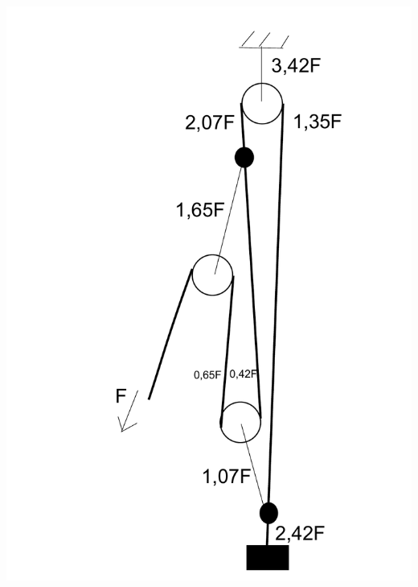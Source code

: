\documentclass[11pt]{article}
\begin{document}
{\begin{center}
\includegraphics[scale=0.25]{2014-v3g-06-PolyspastL2}
\end{center}
\fi
}
\end{document}
